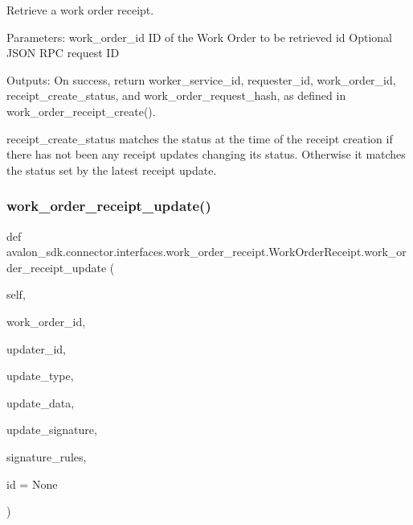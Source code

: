 \begin{DoxyVerb}Retrieve a work order receipt.

Parameters:
work_order_id    ID of the Work Order to be retrieved
id               Optional JSON RPC request ID

Outputs:
On success, return worker_service_id, requester_id, work_order_id,
receipt_create_status, and work_order_request_hash, as defined in
work_order_receipt_create().

receipt_create_status matches the status at the time of the
receipt creation if there has not been any receipt updates
changing its status. Otherwise it matches the status set by
the latest receipt update.
\end{DoxyVerb}
 \mbox{\label{classavalon__sdk_1_1connector_1_1interfaces_1_1work__order__receipt_1_1WorkOrderReceipt_ac5b1f9823491b4b24daa50d146b7ec43}} 
\subsubsection{\texorpdfstring{work\+\_\+order\+\_\+receipt\+\_\+update()}{work\_order\_receipt\_update()}\hspace{0.1cm}{\footnotesize\ttfamily [1/2]}}
{\footnotesize\ttfamily def avalon\+\_\+sdk.\+connector.\+interfaces.\+work\+\_\+order\+\_\+receipt.\+Work\+Order\+Receipt.\+work\+\_\+order\+\_\+receipt\+\_\+update (\begin{DoxyParamCaption}\item[{}]{self,  }\item[{}]{work\+\_\+order\+\_\+id,  }\item[{}]{updater\+\_\+id,  }\item[{}]{update\+\_\+type,  }\item[{}]{update\+\_\+data,  }\item[{}]{update\+\_\+signature,  }\item[{}]{signature\+\_\+rules,  }\item[{}]{id = {\ttfamily None} }\end{DoxyParamCaption})}

